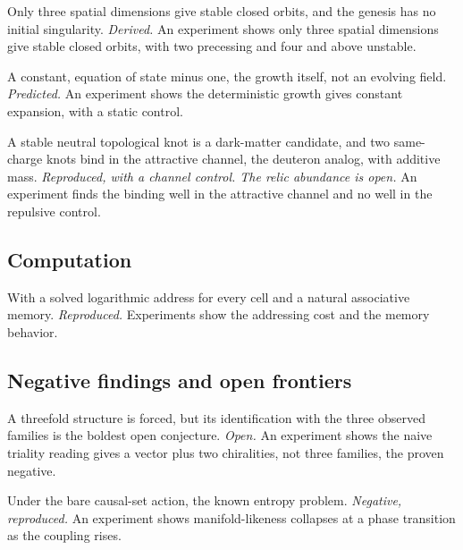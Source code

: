 \begin{finding}
Only three spatial dimensions give stable closed orbits, and the genesis has no initial singularity. \emph{Derived.} An experiment shows only three spatial dimensions give stable closed orbits, with two precessing and four and above unstable.
\end{finding}

\begin{finding}
A constant, equation of state minus one, the growth itself, not an evolving field. \emph{Predicted.} An experiment shows the deterministic growth gives constant expansion, with a static control.
\end{finding}

\begin{finding}
A stable neutral topological knot is a dark-matter candidate, and two same-charge knots bind in the attractive channel, the deuteron analog, with additive mass. \emph{Reproduced, with a channel control. The relic abundance is open.} An experiment finds the binding well in the attractive channel and no well in the repulsive control.
\end{finding}

\subsection*{Computation}

\begin{finding}
With a solved logarithmic address for every cell and a natural associative memory. \emph{Reproduced.} Experiments show the addressing cost and the memory behavior.
\end{finding}

\subsection*{Negative findings and open frontiers}

\begin{finding}
A threefold structure is forced, but its identification with the three observed families is the boldest open conjecture. \emph{Open.} An experiment shows the naive triality reading gives a vector plus two chiralities, not three families, the proven negative.
\end{finding}

\begin{finding}
Under the bare causal-set action, the known entropy problem. \emph{Negative, reproduced.} An experiment shows manifold-likeness collapses at a phase transition as the coupling rises.
\end{finding}

